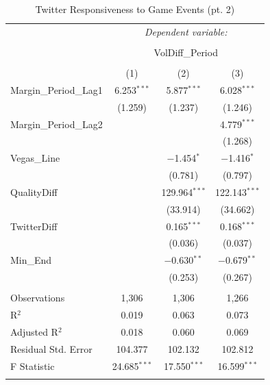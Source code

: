 \documentclass[12pt]{article}
\begin{document}
\begin{doublespacing}
\begin{table}[H] 
\centering 
\caption{Twitter Responsiveness to Game Events (pt. 2)} 
\label{} 
\begin{tabular*}{\textwidth}{@{\extracolsep{\fill}}lccc} 
\hline 
\hline
 & \multicolumn{3}{c}{\textit{Dependent variable:}} \\ 
\cline{2-4} 
\\[-3.0ex] & \multicolumn{3}{c}{VolDiff\_Period} \\ 
\\[-1.5ex] & (1) & (2) & (3)\\ 
\hline
 Margin\_Period\_Lag1 & 6.253$^{***}$ & 5.877$^{***}$ & 6.028$^{***}$ \\ 
  & (1.259) & (1.237) & (1.246) \\ 
 Margin\_Period\_Lag2 &  &  & 4.779$^{***}$ \\ 
  &  &  & (1.268) \\ 
 Vegas\_Line &  & $-$1.454$^{*}$ & $-$1.416$^{*}$ \\ 
  &  & (0.781) & (0.797) \\ 
 QualityDiff &  & 129.964$^{***}$ & 122.143$^{***}$ \\ 
  &  & (33.914) & (34.662) \\ 
 TwitterDiff &  & 0.165$^{***}$ & 0.168$^{***}$ \\ 
  &  & (0.036) & (0.037) \\ 
 Min\_End &  & $-$0.630$^{**}$ & $-$0.679$^{**}$ \\ 
  &  & (0.253) & (0.267) \\ 
\hline \\[-1.8ex] 
Observations & 1,306 & 1,306 & 1,266 \\ 
R$^{2}$ & 0.019 & 0.063 & 0.073 \\ 
Adjusted R$^{2}$ & 0.018 & 0.060 & 0.069 \\ 
Residual Std. Error & 104.377 & 102.132 & 102.812 \\ 
F Statistic & 24.685$^{***}$  & 17.550$^{***}$ & 16.599$^{***}$ \\
\hline 
\hline \\[-1.8ex] 
\end{tabular*} 
\end{table} 


\end{doublespacing}
\end{document}

